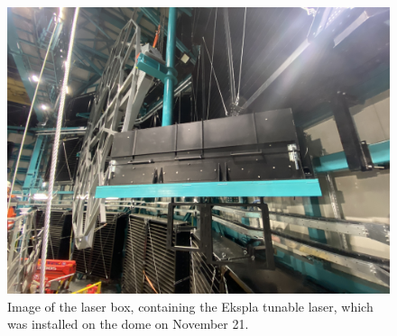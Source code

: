 \begin{figure}[htbp]
  \includegraphics[height=0.5\textheight]{throughput_for_focused_light_figures/laser_on_dome}
  \caption{Image of the laser box, containing the Ekspla tunable laser, which was installed on the dome on November 21.}
  \label{fig:laser}
\end{figure}
